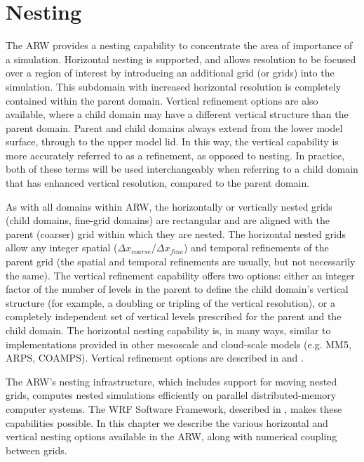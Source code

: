 \chapter{Nesting}
\label{nesting_chap}

The ARW provides a nesting capability to concentrate the area of importance of a simulation. 
Horizontal nesting is supported, and allows resolution to be
focused over a region of interest by introducing an additional grid (or
grids) into the simulation.  This subdomain with increased horizontal resolution is completely
contained within the parent domain. Vertical refinement options are also 
available, where a child domain may have a different vertical structure than
the parent domain. Parent and child domains always extend from the lower model surface,
through to the upper model lid. In this way, the vertical capability is more accurately referred
to as a refinement, as opposed to nesting. In practice, both of these terms will be used 
interchangeably when referring to a child domain that has enhanced vertical resolution, 
compared to the parent domain.

As with all domains within ARW, the horizontally or vertically nested grids (child domains, 
fine-grid domains) are rectangular
and are aligned with the parent (coarser) grid within which they are
nested.  
The horizontal nested grids allow any integer spatial
($\Delta x_{coarse}/\Delta x_{fine}$) 
and temporal refinements of the
parent grid (the spatial and temporal refinements are usually,
but not necessarily the same).  
The vertical refinement capability offers two options: either an integer factor of the
number of levels in the parent to define the child domain's vertical structure (for example, 
a doubling or tripling of the vertical resolution), or a completely independent set of 
vertical levels prescribed for the parent and the child domain.
The horizontal nesting capability is, in many ways, similar to
implementations provided in other mesoscale and cloud-scale models (e.g. MM5,
ARPS, COAMPS). Vertical refinement options are described in 
\citet{mahalovmoustaoui09} and \citet{daniels16}.

The ARW's nesting
infrastructure, which includes support for moving nested grids,
computes nested simulations efficiently on parallel distributed-memory computer systems.
The WRF Software Framework, described in
\citet{michalak04}, makes these capabilities possible.  In this chapter we
describe the various horizontal and vertical nesting options available in the ARW, along with
numerical coupling between grids.

